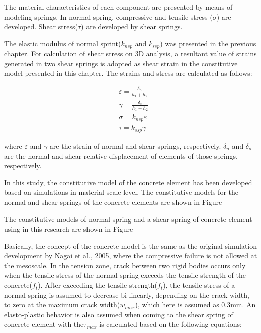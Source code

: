 The material characteristics of each component are presented by means of modeling springs. In normal spring, compressive and tensile stress ($\sigma$) are developed. Shear stress($\tau$) are developed by shear springs.

The elastic modulus of normal sprint($k_{nsp}$ and $k_{ssp}$) was presented in the previous chapter. For calculation of shear stress on 3D analysis, a resultant value of strains generated in two shear springs is adopted as shear strain in the constitutive model presented in this chapter. The strains and stress are calculated as follows:

\begin{equation}
  \begin{aligned}
  &\varepsilon = \frac{\delta_n}{h_1 + h_2}\\
  &\gamma = \frac{\delta_s}{h_1 + h_2}\\
  &\sigma = k_{nsp}\varepsilon\\
  &\tau = k_{ssp}\gamma
  \end{aligned}
\end{equation}

where $\varepsilon$ and $\gamma$ are the strain of normal and shear springs, respectively. $\delta_n$ and $\delta_s$ are the normal and shear relative displacement of elements of those springs, respectively.

In this study, the constitutive model of the concrete element has been developed based on simulations in material scale level. The constitutive models for the normal and shear springs of the concrete elements are shown in Figure %


The constitutive models of normal spring and a shear spring of concrete element using in this research are shown in Figure %

Basically, the concept of the concrete model is the same as the original simulation development by Nagai et al., 2005, where the compressive failure is not allowed at the mesoscale. In the tension zone, crack between two rigid bodies occurs only when the tensile stress of the normal spring exceeds the tensile strength of the concrete($f_t$). After exceeding the tensile strength($f_t$), the tensile stress of a normal spring is assumed to decrease bi-linearly, depending on the crack width, to zero at the maximum crack width($w_{max}$), which here is assumed as 0.3mm. An elasto-plastic behavior is also assumed when coming to the shear spring of concrete element with the$\tau_{max}$ is calculated based on the following equations:

